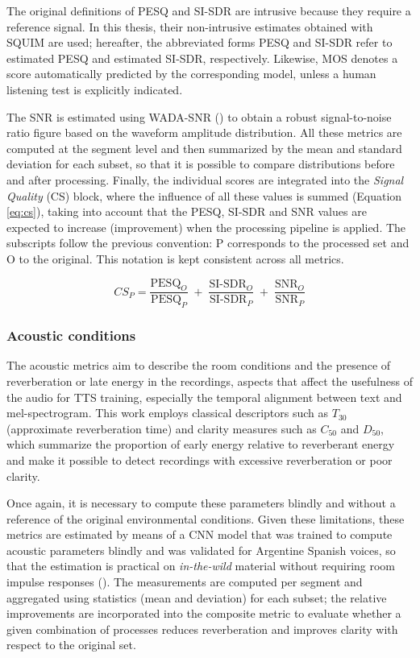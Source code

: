 The original definitions of PESQ and SI-SDR are intrusive because they require a reference signal. In this thesis, their non-intrusive estimates obtained with SQUIM are used; hereafter, the abbreviated forms PESQ and SI-SDR refer to estimated PESQ and estimated SI-SDR, respectively. Likewise, MOS denotes a score automatically predicted by the corresponding model, unless a human listening test is explicitly indicated.

The SNR is estimated using WADA-SNR (\cite{wada}) to obtain a robust signal-to-noise ratio figure based on the waveform amplitude distribution. All these metrics are computed at the segment level and then summarized by the mean and standard deviation for each subset, so that it is possible to compare distributions before and after processing. Finally, the individual scores are integrated into the \emph{Signal Quality} (CS) block, where the influence of all these values is summed (Equation \ref{eq:cs}), taking into account that the PESQ, SI-SDR and SNR values are expected to increase (improvement) when the processing pipeline is applied. The subscripts follow the previous convention: P corresponds to the processed set and O to the original. This notation is kept consistent across all metrics.

\begin{equation}
\label{eq:cs}
CS_P =
\frac{\mathrm{PESQ}_O}{\mathrm{PESQ}_P}
\;+\; \frac{\mathrm{SI\text{-}SDR}_O}{\mathrm{SI\text{-}SDR}_P}
\;+\; \frac{\mathrm{SNR}_O}{\mathrm{SNR}_P}
\end{equation}

\subsubsection{Acoustic conditions}
The acoustic metrics aim to describe the room conditions and the presence of reverberation or late energy in the recordings, aspects that affect the usefulness of the audio for TTS training, especially the temporal alignment between text and mel-spectrogram. This work employs classical descriptors such as $T_{30}$ (approximate reverberation time) and clarity measures such as $C_{50}$ and $D_{50}$, which summarize the proportion of early energy relative to reverberant energy and make it possible to detect recordings with excessive reverberation or poor clarity.

Once again, it is necessary to compute these parameters blindly and without a reference of the original environmental conditions. Given these limitations, these metrics are estimated by means of a CNN model that was trained to compute acoustic parameters blindly and was validated for Argentine Spanish voices, so that the estimation is practical on \emph{in-the-wild} material without requiring room impulse responses (\cite{Maxi2}). The measurements are computed per segment and aggregated using statistics (mean and deviation) for each subset; the relative improvements are incorporated into the composite metric to evaluate whether a given combination of processes reduces reverberation and improves clarity with respect to the original set.

